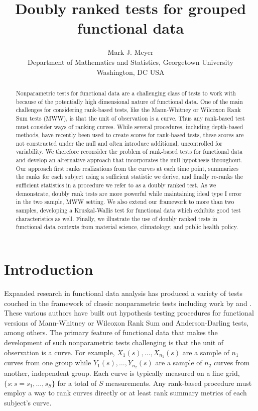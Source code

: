 \documentclass[12pt]{article}
\title{\vspace{-40pt}Doubly ranked tests for grouped functional data\vspace{-10pt}}
\author{Mark J. Meyer \\ Department of Mathematics and Statistics, Georgetown University \\ Washington, DC USA}
\date{}
\theoremstyle{plain}
\begin{document}
	\maketitle
	
\begin{abstract}
Nonparametric tests for functional data are a challenging class of tests to work with because of the potentially high dimensional nature of functional data. One of the main challenges for considering rank-based tests, like the Mann-Whitney or Wilcoxon Rank Sum tests (MWW), is that the unit of observation is a curve. Thus any rank-based test must consider ways of ranking curves. While several procedures, including depth-based methods, have recently been used to create scores for rank-based tests, these scores are not constructed under the null and often introduce additional, uncontrolled for variability. We therefore reconsider the problem of rank-based tests for functional data and develop an alternative approach that incorporates the null hypothesis throughout. Our approach first ranks realizations from the curves at each time point, summarizes the ranks for each subject using a sufficient statistic we derive, and finally re-ranks the sufficient statistics in a procedure we refer to as a doubly ranked test. As we demonstrate, doubly rank tests are more powerful while maintaining ideal type I error in the two sample, MWW setting. We also extend our framework to more than two samples, developing a Kruskal-Wallis test for functional data which exhibits good test characteristics as well. Finally, we illustrate the use of doubly ranked tests in functional data contexts from material science, climatology, and public health policy.
\end{abstract}

	\section{Introduction}
	\label{s:intro}
	
	Expanded research in functional data analysis has produced a variety of tests couched in the framework of classic nonparametric tests including work by \cite{Hall2007, Lopez2009, Lopez2010, Chak2015, PomannStaicu2016, Lopez2017, Abramowicz2018} and \cite{Melendez2021}. These various authors have built out hypothesis testing procedures for functional versions of Mann-Whitney or Wilcoxon Rank Sum and Anderson-Darling tests, among others. The primary feature of functional data that makes the development of such nonparametric tests challenging is that the unit of observation is a curve. For example, $X_1(s), \ldots, X_{n_1}(s)$ are a sample of $n_1$ curves from one group while $Y_1(s), \ldots, Y_{n_2}(s)$ are a sample of $n_2$ curves from another, independent group. Each curve is typically measured on a fine grid, $\{s : s = s_1, \ldots, s_S\}$ for a total of $S$ measurements. Any rank-based procedure must employ a way to rank curves directly or at least rank summary metrics of each subject's curve.
	
\end{document}
